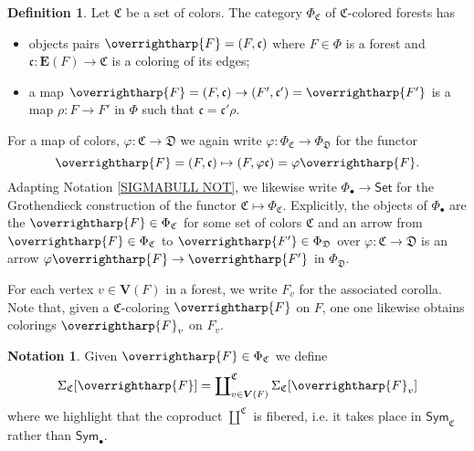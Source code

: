 \documentclass[a4paper,10pt
 ,final
]{article}%
\numberwithin{equation}{section}
\numberwithin{figure}{section}
\theoremstyle{definition} %
\newtheorem{definition}[equation]{Definition}%
\newtheorem{notation}[equation]{Notation}%
\newcommand{\vect}[1]{\text{\overrightharp{\ensuremath{#1}}}}
\newcommand{\1}{\ensuremath{\mathbbm 1}}%
\begin{document}
\begin{definition}\label{COLFOR DEF}
Let $\mathfrak{C}$ be a set of colors.
The category $\Phi_{\mathfrak{C}}$ of $\mathfrak{C}$-colored forests has
\begin{itemize}
\item objects pairs
$\vect{F} = (F,\mathfrak{c})$
where 
$F\in \Phi$ is a forest
and 
$\mathfrak{c}\colon \boldsymbol{E}(F) \to \mathfrak{C}$ 
is a coloring of its edges;
\item a map
$\vect{F}=(F,\mathfrak{c}) \to 
(F',\mathfrak{c}') = \vect{F'}$
is a map $\rho \colon F \to F'$ in $\Phi$
such that
$\mathfrak{c} = \mathfrak{c}' \rho$.
\end{itemize}
For a map of colors,
$\varphi\colon \mathfrak{C} \to \mathfrak{D}$
we again write
$\varphi \colon \Phi_{\mathfrak{C}} \to \Phi_{\mathfrak{D}}$
for the functor  
\begin{equation}
        \label{PHIF_EQ}
        \vect{F} = (F,\mathfrak{c})
        \mapsto (F,\varphi\mathfrak{c}) = \varphi\vect{F}.
\end{equation}
Adapting Notation \ref{SIGMABULL NOT},
we likewise write
$\Phi_{\bullet} \to \mathsf{Set}$
for the Grothendieck construction of the functor 
$\mathfrak{C} \mapsto \Phi_{\mathfrak{C}}$.
Explicitly, 
the objects of $\Phi_{\bullet}$
are the $\vect{F} \in \Phi_{\mathfrak{C}}$ 
for some set of colors $\mathfrak{C}$
and an arrow from
$\vect{F} \in \Phi_{\mathfrak{C}}$ to
$\vect{F'} \in \Phi_{\mathfrak{D}}$
over $\varphi \colon \mathfrak{C} \to \mathfrak{D}$
is an arrow
$\varphi \vect{F} \to \vect{F'}$ in $\Phi_{\mathfrak{D}}$.
\end{definition}





For each vertex $v \in \boldsymbol{V}(F)$ in a forest,
we write $F_v$ for the associated corolla.
Note that, given a $\mathfrak{C}$-coloring $\vect{F}$ on $F$,
one one likewise obtains colorings $\vect{F}_v$ on $F_v$.



\begin{notation}
Given $\vect{F} \in \Phi_{\mathfrak{C}}$
we define
\begin{equation}\label{GENSIGC EQ}
\Sigma_{\mathfrak{C}}[\vect{F}]=
\coprod\nolimits^{\mathfrak{C}}_{v \in \boldsymbol{V}(F)} 
\Sigma_{\mathfrak{C}}[\vect{F}_v]
\end{equation}
where we highlight that the coproduct $\amalg^{\mathfrak{C}}$ is fibered, i.e. it takes place in $\mathsf{Sym}_{\mathfrak{C}}$
rather than $\mathsf{Sym}_{\bullet}$.
\end{notation}
\end{document}
